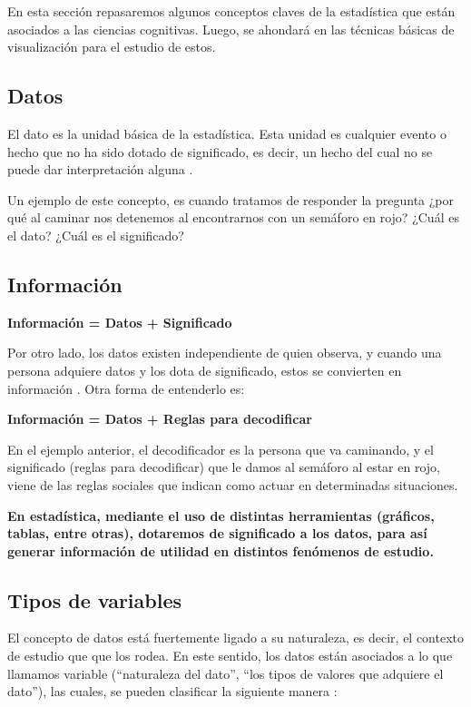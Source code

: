 \documentclass[
]{book}
\begin{document}
En esta sección repasaremos algunos conceptos claves de la estadística que están asociados a las ciencias cognitivas. Luego, se ahondará en las técnicas básicas de visualización para el estudio de estos.

\hypertarget{datos}{%
\subsection{Datos}\label{datos}}

El dato es la unidad básica de la estadística. Esta unidad es cualquier evento o hecho que no ha sido dotado de significado, es decir, un hecho del cual no se puede dar interpretación alguna \citep{brachman_knowledge_2004}.

Un ejemplo de este concepto, es cuando tratamos de responder la pregunta ¿por qué al caminar nos detenemos al encontrarnos con un semáforo en rojo? ¿Cuál es el dato? ¿Cuál es el significado?

\hypertarget{informaciuxf3n}{%
\subsection{Información}\label{informaciuxf3n}}

\textbf{Información = Datos + Significado}

Por otro lado, los datos existen independiente de quien observa, y cuando una persona adquiere datos y los dota de significado, estos se convierten en información \citep{brachman_knowledge_2004}. Otra forma de entenderlo es:

\textbf{Información = Datos + Reglas para decodificar}

En el ejemplo anterior, el decodificador es la persona que va caminando, y el significado (reglas para decodificar) que le damos al semáforo al estar en rojo, viene de las reglas sociales que indican como actuar en determinadas situaciones.

\textbf{En estadística, mediante el uso de distintas herramientas (gráficos, tablas, entre otras), dotaremos de significado a los datos, para así generar información de utilidad en distintos fenómenos de estudio.}

\hypertarget{tipos-de-variables}{%
\subsection{Tipos de variables}\label{tipos-de-variables}}

El concepto de datos está fuertemente ligado a su naturaleza, es decir, el contexto de estudio que que los rodea. En este sentido, los datos están asociados a lo que llamamos variable (``naturaleza del dato'', ``los tipos de valores que adquiere el dato''), las cuales, se pueden clasificar la siguiente manera \citep[página 7]{anderson}:
\end{document}
